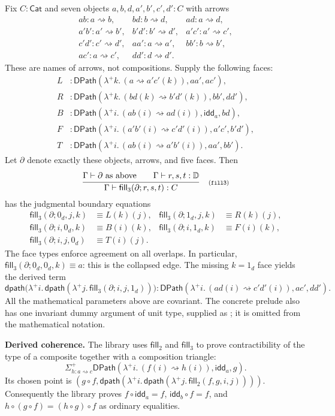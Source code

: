 \documentclass[11pt,a4paper]{article}
\newcommand{\Cat}{\mathsf{Cat}}
\newcommand{\DI}{\mathbb D}
\newcommand{\dl}{0_{\!d}}
\newcommand{\dr}{1_{\!d}}
\newcommand{\DPath}{\mathsf{DPath}}
\newcommand{\dpath}{\mathsf{dpath}}
\newcommand{\idd}{\mathsf{idd}}
\newcommand{\filltwo}{\mathsf{fill}_{2}}
\newcommand{\fillthree}{\mathsf{fill}_{3}}
\newcommand{\arr}{\mathrel{\rightsquigarrow}}
\newcommand{\lamplus}[1]{\lambda^{+}#1.\,}
\newcommand{\rulelabel}[1]{\quad\text{\scriptsize(#1)}}
\newcommand{\infer}[3]{\frac{\begin{gathered}#1\end{gathered}}{#2}\rulelabel{#3}}
\newcommand{\code}[1]{\texttt{\detokenize{#1}}}
\begin{document}
Fix $C:\Cat$ and seven objects $a,b,d,a',b',c',d':C$ with arrows
\[
\begin{array}{lll}
 ab:a\arr b,& bd:b\arr d,& ad:a\arr d,\\
 a'b':a'\arr b',& b'd':b'\arr d',& a'c':a'\arr c',\\
 c'd':c'\arr d',& aa':a\arr a',& bb':b\arr b',\\
 ac':a\arr c',& dd':d\arr d'.&
\end{array}
\]
These are names of arrows, not compositions. Supply the following faces:
\begin{align*}
 L&:\DPath(\lamplus{k}(a\arr a'c'(k)),aa',ac'),\\
 R&:\DPath(\lamplus{k}(bd(k)\arr b'd'(k)),bb',dd'),\\
 B&:\DPath(\lamplus{i}(ab(i)\arr ad(i)),\idd_a,bd),\\
 F&:\DPath(\lamplus{i}(a'b'(i)\arr c'd'(i)),a'c',b'd'),\\
 T&:\DPath(\lamplus{i}(ab(i)\arr a'b'(i)),aa',bb').
\end{align*}
Let $\partial$ denote exactly these objects, arrows, and five faces. Then
\[
\infer{\Gamma\vdash\partial\ \text{as above}\qquad
       \Gamma\vdash r,s,t:\DI}
 {\Gamma\vdash\fillthree(\partial;r,s,t):C}{\code{fill3}}
\]
has the judgmental boundary equations
\begin{align*}
 \fillthree(\partial;\dl,j,k)&\equiv L(k)(j),&
 \fillthree(\partial;\dr,j,k)&\equiv R(k)(j),\\
 \fillthree(\partial;i,\dl,k)&\equiv B(i)(k),&
 \fillthree(\partial;i,\dr,k)&\equiv F(i)(k),\\
 \fillthree(\partial;i,j,\dl)&\equiv T(i)(j).&&
\end{align*}
The face types enforce agreement on all overlaps. In particular,
$\fillthree(\partial;\dl,\dl,k)\equiv a$: this is the collapsed edge.
The missing $k=\dr$ face yields the derived term
\[
 \dpath\bigl(\lamplus{i}\dpath(\lamplus{j}
              \fillthree(\partial;i,j,\dr))\bigr)
 :\DPath(\lamplus{i}(ad(i)\arr c'd'(i)),ac',dd').
\]
All the mathematical parameters above are covariant. The concrete prelude
also has one invariant dummy argument of unit type, supplied as
\code{fill3 ()}; it is omitted from the mathematical notation.

\textbf{Derived coherence.} The library uses $\filltwo$ and $\fillthree$
to prove contractibility of the type of a composite together with a
composition triangle:
\[
 \Sigma^{+}_{h:a\arr c}
   \DPath(\lamplus{i}(f(i)\arr h(i)),\idd_a,g).
\]
Its chosen point is
$(g\circ f,\dpath(\lamplus{i}\dpath(\lamplus{j}\filltwo(f,g,i,j))))$.
Consequently the library proves
$f\circ\idd_a=f$, $\idd_b\circ f=f$, and
$h\circ(g\circ f)=(h\circ g)\circ f$ as ordinary equalities.
\end{document}
